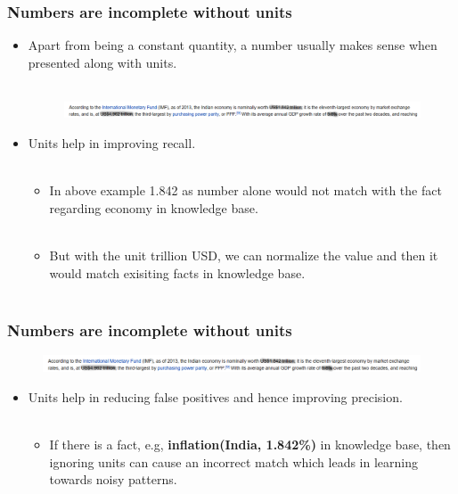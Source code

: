 \documentclass{beamer}
\begin{document}
\begin{frame}
 
 \frametitle{Numbers are incomplete without units} \pause
 
 \begin{itemize}
  
  \item  Apart from being a constant quantity, a number usually makes sense when presented along with units. \pause \\~\\
  
    \begin{figure}
    \centering
    \includegraphics[width = 1.0\textwidth]{images/ex_6}
  \end{figure}
  \pause 
  \item Units help in improving recall.  \pause \\~\\
  
  \begin{itemize}
      \item In above example 1.842 as number alone would not match with the fact regarding economy in knowledge base. \pause \\~\\
      \item But with the unit trillion USD, we can normalize the value and then it would match exisiting facts in knowledge base.  \\~\\
      
  \end{itemize}
  \end{itemize}
  \end{frame}
  
\begin{frame}
  \frametitle{Numbers are incomplete without units} 
    \begin{figure}
    \centering
    \includegraphics[width = 1.0\textwidth]{images/ex_6}
  \end{figure}
  
  \begin{itemize}
  \item Units help in reducing false positives and hence improving precision. \pause \\~\\
  \begin{itemize}
      \item If there is a fact, e.g, \textbf{inflation(India, 1.842\%)} in knowledge base, then ignoring units can cause an incorrect match which leads in learning towards noisy patterns. \\~\\
  \end{itemize}
  
 \end{itemize}

 
\end{frame}
\end{document}
